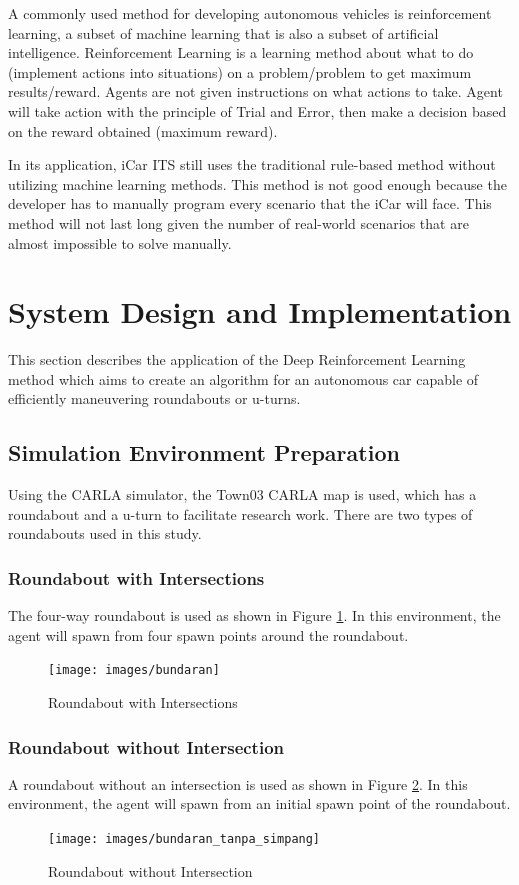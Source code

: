 \documentclass[conference]{IEEEtran}
\begin{document}
	
	A commonly used method for developing autonomous vehicles is reinforcement learning, a subset of machine learning that is also a subset of artificial intelligence. Reinforcement Learning is a learning method about what to do (implement actions into situations) on a problem/problem to get maximum results/reward. Agents are not given instructions on what actions to take. Agent will take action with the principle of Trial and Error, then make a decision based on the reward obtained (maximum reward).
	
	In its application, iCar ITS still uses the traditional rule-based method without utilizing machine learning methods. This method is not good enough because the developer has to manually program every scenario that the iCar will face. This method will not last long given the number of real-world scenarios that are almost impossible to solve manually.
	
	\section{System Design and Implementation}
	\vspace{1ex}
	This section describes the application of the Deep Reinforcement Learning method which aims to create an algorithm for an autonomous car capable of efficiently maneuvering roundabouts or u-turns.
	
\subsection{Simulation Environment Preparation}
\label{sec:simulasi}
Using the CARLA simulator, the Town03 CARLA map is used, which has a roundabout and a u-turn to facilitate research work. There are two types of roundabouts used in this study.

\subsubsection{Roundabout with Intersections}
The four-way roundabout is used as shown in Figure \ref{fig:bundaran_town03}. In this environment, the agent will spawn from four spawn points around the roundabout.
\begin{figure}[H] 
	\centering
	\texttt{[image: images/bundaran]}
	\caption{Roundabout with Intersections}
	\label{fig:bundaran_town03}
\end{figure}

\subsubsection{Roundabout without Intersection}
A roundabout without an intersection is used as shown in Figure  \ref{fig:bundaran_tanpa_simpang}. In this environment, the agent will spawn from an initial spawn point of the roundabout.
\begin{figure}[H] 
	\centering
	\texttt{[image: images/bundaran\_tanpa\_simpang]}
	\caption{Roundabout without Intersection}
	\label{fig:bundaran_tanpa_simpang}
\end{figure}
\end{document}
